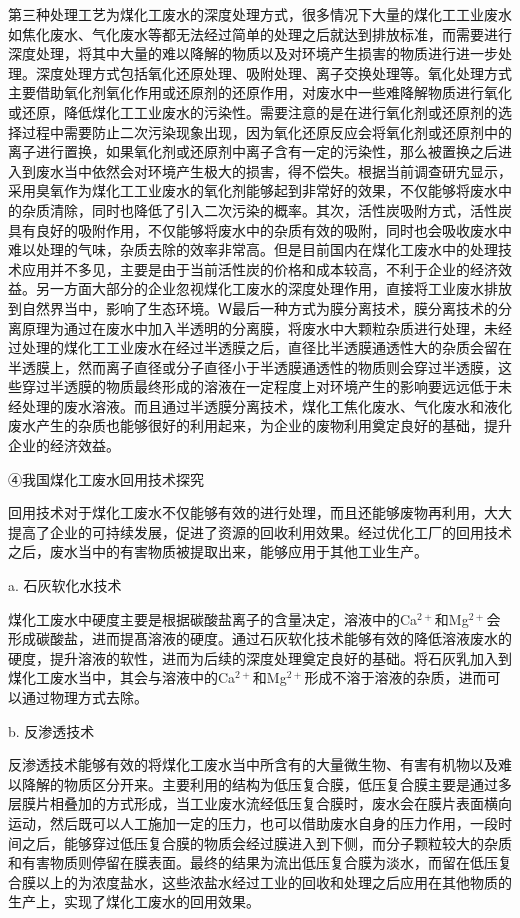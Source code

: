 第三种处理工艺为煤化工废水的深度处理方式，很多情况下大量的煤化工工业废水如焦化废水、气化废水等都无法经过简单的处理之后就达到排放标准，而需要进行深度处理，将其中大量的难以降解的物质以及对环境产生损害的物质进行进一步处理。深度处理方式包括氧化还原处理、吸附处理、离子交换处理等。氧化处理方式主要借助氧化剂氧化作用或还原剂的还原作用，对废水中一些难降解物质进行氧化或还原，降低煤化工工业废水的污染性。\cite{zhangdong_2016}需要注意的是在进行氧化剂或还原剂的选择过程中需要防止二次污染现象出现，因为氧化还原反应会将氧化剂或还原剂中的离子进行置换，如果氧化剂或还原剂中离子含有一定的污染性，那么被置换之后进入到废水当中依然会对环境产生极大的损害，得不偿失。根据当前调查研宄显示，采用臭氧作为煤化工工业废水的氧化剂能够起到非常好的效果，不仅能够将废水中的杂质清除，同时也降低了引入二次污染的概率。其次，活性炭吸附方式，活性炭具有良好的吸附作用，不仅能够将废水中的杂质有效的吸附，同时也会吸收废水中难以处理的气味，杂质去除的效率非常高。但是目前国内在煤化工废水中的处理技术应用并不多见，主要是由于当前活性炭的价格和成本较高，不利于企业的经济效益。另一方面大部分的企业忽视煤化工废水的深度处理作用，直接将工业废水排放到自然界当中，影响了生态环境。Ｗ最后一种方式为膜分离技术，膜分离技术的分离原理为通过在废水中加入半透明的分离膜，将废水中大颗粒杂质进行处理，未经过处理的煤化工工业废水在经过半透膜之后，直径比半透膜通透性大的杂质会留在半透膜上，然而离子直径或分子直径小于半透膜通透性的物质则会穿过半透膜，这些穿过半透膜的物质最终形成的溶液在一定程度上对环境产生的影响要远远低于未经处理的废水溶液。而且通过半透膜分离技术，煤化工焦化废水、气化废水和液化废水产生的杂质也能够很好的利用起来，为企业的废物利用奠定良好的基础，提升企业的经济效益。\cite{zengsiyuan_2016}\par

④我国煤化工废水回用技术探究\par
回用技术对于煤化工废水不仅能够有效的进行处理，而且还能够废物再利用，大大提高了企业的可持续发展，促进了资源的回收利用效果。经过优化工厂的回用技术之后，废水当中的有害物质被提取出来，能够应用于其他工业生产。\par

a. 石灰软化水技术\par
煤化工废水中硬度主要是根据碳酸盐离子的含量决定，溶液中的Ca$^{2+}$和Mg$^{2+}$会形成碳酸盐，进而提髙溶液的硬度。通过石灰软化技术能够有效的降低溶液废水的硬度，提升溶液的软性，进而为后续的深度处理奠定良好的基础。将石灰乳加入到煤化工废水当中，其会与溶液中的Ca$^{2+}$和Mg$^{2+}$形成不溶于溶液的杂质，进而可以通过物理方式去除。\cite{zhangzhiwei_2013}\par

b. 反渗透技术\par
反渗透技术能够有效的将煤化工废水当中所含有的大量微生物、有害有机物以及难以降解的物质区分开来。主要利用的结构为低压复合膜，低压复合膜主要是通过多层膜片相叠加的方式形成，当工业废水流经低压复合膜时，废水会在膜片表面横向运动，然后既可以人工施加一定的压力，也可以借助废水自身的压力作用，一段时间之后，能够穿过低压复合膜的物质会经过膜进入到下侧，而分子颗粒较大的杂质和有害物质则停留在膜表面。最终的结果为流出低压复合膜为淡水，而留在低压复合膜以上的为浓度盐水，这些浓盐水经过工业的回收和处理之后应用在其他物质的生产上，实现了煤化工废水的回用效果。\cite{zhuanghaifeng_2016}\par

